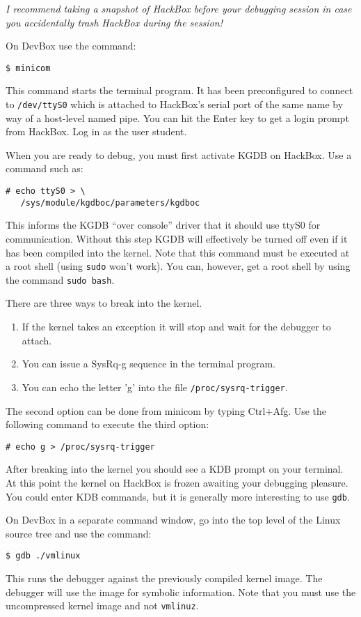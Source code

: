 \documentclass[twocolumn]{article}
\newcommand{\command}[1]{\texttt{#1}}
\begin{document}
\emph{I recommend taking a snapshot of HackBox before your debugging session in case you
  accidentally trash HackBox during the session!}

On DevBox use the command:
\begin{Verbatim}
$ minicom
\end{Verbatim}
This command starts the terminal program. It has been preconfigured to connect to
\texttt{/dev/ttyS0} which is attached to HackBox's serial port of the same name by way of a
host-level named pipe. You can hit the Enter key to get a login prompt from HackBox. Log in as
the user student.

When you are ready to debug, you must first activate KGDB on HackBox. Use a command such as:
\begin{Verbatim}
# echo ttyS0 > \
   /sys/module/kgdboc/parameters/kgdboc
\end{Verbatim}
This informs the KGDB ``over console'' driver that it should use ttyS0 for communication.
Without this step KGDB will effectively be turned off even if it has been compiled into the
kernel. Note that this command must be executed at a root shell (using \texttt{sudo} won't
work). You can, however, get a root shell by using the command \command{sudo bash}.

There are three ways to break into the kernel.
\begin{enumerate}
\item If the kernel takes an exception it will stop and wait for the debugger to attach.
\item You can issue a SysRq-g sequence in the terminal program.
\item You can echo the letter 'g' into the file \texttt{/proc/\-sysrq-trigger}.
\end{enumerate}

The second option can be done from minicom by typing Ctrl+Afg. Use the following command to
execute the third option:
\begin{Verbatim}
# echo g > /proc/sysrq-trigger
\end{Verbatim}

After breaking into the kernel you should see a KDB prompt on your terminal. At this point the
kernel on HackBox is frozen awaiting your debugging pleasure. You could enter KDB commands, but
it is generally more interesting to use \texttt{gdb}.

On DevBox in a separate command window, go into the top level of the Linux source tree and use
the command:
\begin{Verbatim}
$ gdb ./vmlinux
\end{Verbatim}
This runs the debugger against the previously compiled kernel image. The debugger will use the
image for symbolic information. Note that you must use the uncompressed kernel image and not
\texttt{vmlinuz}.
\end{document}
